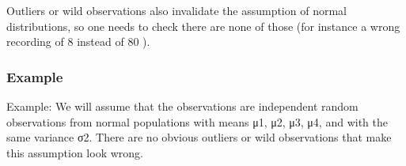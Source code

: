 Outliers or wild observations also invalidate the assumption of normal distributions, so one needs to check there are none of those (for instance a wrong recording of 8 instead of 80 ).


\subsubsection{Example}
Example: We will assume that the observations are independent random observations from normal populations with means μ1, μ2, μ3, μ4, and with the same variance σ2. There are no obvious outliers or wild observations that make this assumption look wrong.
